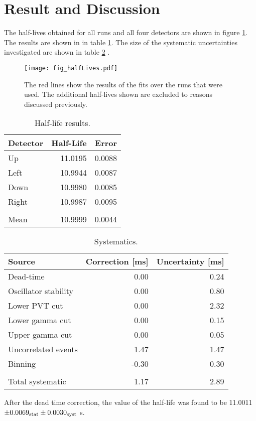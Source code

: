 \documentclass[MaxHughesThesis.tex]{subfiles}
\begin{document}
\section{Result and Discussion}
\label{sec:result}

The half-lives obtained for all runs and all four detectors are shown in figure \ref{fig:PVT2by2}.
The results  are shown in  in table \ref{tab:PVTTable}.
The size of the systematic uncertainties investigated are shown in table \ref{tab:SysTable} .
\begin{figure}[!htb]
	\centerline{\texttt{[image: fig\_halfLives.pdf]}}
	\caption{The red lines show the results of the fits over the runs that were used.
		 The additional half-lives shown are excluded to reasons discussed previously. 
		}
	\label{fig:PVT2by2}
\end{figure}
	\begin{table}[!hbt]
			\centering
			\caption{Half-life results.}
			\begin{tabular}{lrr}
			Detector & Half-Life & Error \\ \hline
			Up & 11.0195 & 0.0088 \\
			Left & 10.9944 & 0.0087 \\
			Down & 10.9980 & 0.0085 \\
			Right & 10.9987 & 0.0095 \\ 
			      &		& 	 \\
			Mean & 10.9999 & 0.0044
			\end{tabular}
			\label{tab:PVTTable}
	\end{table}
\begin{table}[!hbt]
	\caption{Systematics.}
	\centering
	\label{tab:err-budget}
		\begin{tabular}{lrr}
		Source & Correction [ms] & Uncertainty [ms] \\ \hline
		Dead-time & 0.00 & 0.24 \\
		Oscillator stability & 0.00 & 0.80 \\
		Lower PVT cut & 0.00 & 2.32 \\
		Lower gamma cut & 0.00 &  0.15\\
		Upper gamma cut  & 0.00 & 0.05 \\ 
		Uncorrelated events & 1.47 & 1.47 \\
		Binning & -0.30 & 0.30 \\
			&	&	\\
		Total systematic & 1.17 & 2.89
		\end{tabular}
	\label{tab:SysTable}
\end{table}
After the dead time correction, the value of the half-life was found to be 11.0011 $\pm 0.0069_{\rm{stat}} \pm 0.0030_{\rm{syst}}$  s.
\end{document}
